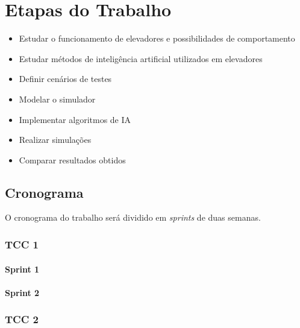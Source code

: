 \chapter{\label{chap:stages}Etapas do Trabalho}

\begin{itemize}
    \item Estudar o funcionamento de elevadores e possibilidades de comportamento
    \item Estudar métodos de inteligência artificial utilizados em elevadores
    \item Definir cenários de testes
    \item Modelar o simulador
    \item Implementar algoritmos de IA
    \item Realizar simulações
    \item Comparar resultados obtidos
\end{itemize}

\section{Cronograma}

O cronograma do trabalho será dividido em \textit{sprints} de duas semanas. 

\subsection{TCC 1}
\subsubsection{Sprint 1}
\subsubsection{Sprint 2}

\subsection{TCC 2}